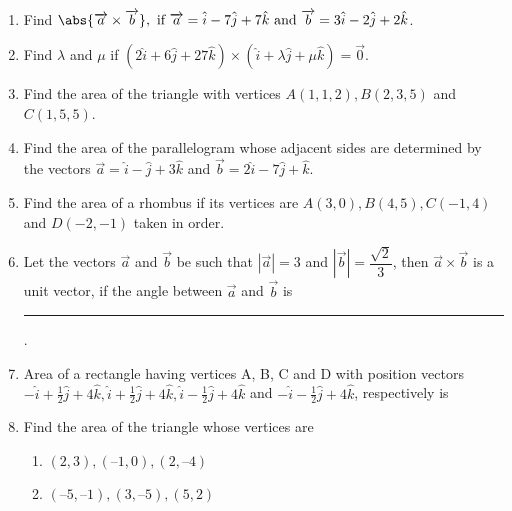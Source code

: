 \begin{enumerate}[label=\thesubsection.\arabic*,ref=\thesubsection.\theenumi]
		\item Find $\abs{\overrightarrow{a}\times\overrightarrow{b}},\text{ if }\overrightarrow{a}=\hat{i}-7\hat{j}+7\hat{k}\text{ and } \overrightarrow{b}=3\hat{i}-2\hat{j}+2\hat{k}$.
	\\
		\solution
		
\item Find $\lambda$ and $\mu$ if $(2\hat{i}+6\hat{j}+27\hat{k})\times(\hat{i}+\lambda \hat{j} + \mu \hat{k})=\overrightarrow{0}$.
	\\
		\solution
		
\item Find the area of the triangle with vertices $A(1, 1, 2), B(2, 3, 5)$ and $C(1, 5, 5)$.
	\\
		\solution
		
\item Find the area of the parallelogram whose adjacent sides are determined by the vectors $\overrightarrow{a}=\hat{i}-\hat{j}+3\hat{k}$ and $\overrightarrow{b}=2\hat{i}-7\hat{j}+\hat{k}$.
	\\
		\solution
		
\item Find the area of a rhombus if its vertices are $A(3,0), B(4,5), C(-1,4)$  and  $D(-2,-1)$ taken in order. 
	\\
		\solution
	
\item Let the vectors $\overrightarrow{a}$ and $\overrightarrow{b}$ be such that $|\overrightarrow{a}| = 3$ and $|\overrightarrow{b}| = \dfrac{\sqrt{2}}{3}$, then $\overrightarrow{a} \times \overrightarrow{b}$ is a unit vector, if the angle between $\overrightarrow{a}$ and $\overrightarrow{b}$ is
\rule{1cm}{0.1pt}.
\\
		\solution
		
\item Area of a rectangle having vertices A, B, C and D with position vectors $ -\hat{i}+ \frac{1}{2} \hat{j}+4\hat{k}, \hat{i}+ \frac{1}{2} \hat{j}+4\hat{k}, \hat{i}-\frac{1}{2} \hat{j}+4\hat{k}$ and $-\hat{i}- \frac{1}{2} \hat{j}+4\hat{k}$, respectively is
	\\
		\solution
		
\item Find the area of the triangle whose vertices are 
\begin{enumerate}
\item $(2, 3), (–1, 0), (2, – 4)$
\item $(–5, –1), (3, –5), (5, 2)$ 

\end{enumerate}
\end{enumerate}

